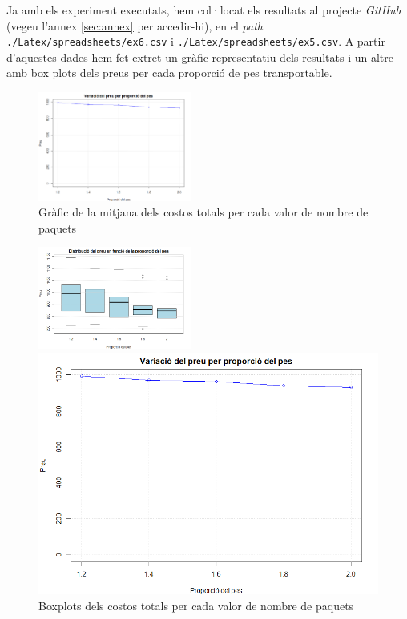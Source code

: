\documentclass[a4paper]{article}
\begin{document}
\begin{table}[ht]
	Ja amb els experiment executats, hem col·locat els resultats al projecte \textit{GitHub} (vegeu l'annex \ref{sec:annex} per accedir-hi), en el \textit{path} \texttt{./Latex/spreadsheets/ex6.csv} i \texttt{./Latex/spreadsheets/ex5.csv}. A partir d'aquestes dades hem fet extret un gràfic representatiu dels resultats i un altre amb box plots dels preus per cada proporció de pes transportable.
	
	\begin{figure}[H]
		\centering
		\includegraphics[width=0.45\textwidth]{exp5_grafic_lineal.png}
		\caption{Gràfic de la mitjana dels costos totals per cada valor de nombre de paquets}
		\label{fig:exp5_grafic_lineal}
	\end{figure}
	\begin{figure}[H]
		\centering
		\includegraphics[width=0.45\textwidth]{images/exp5_boxplot.png}
		\caption{Boxplots dels costos totals per cada valor de nombre de paquets}
		\label{fig:exp5_boxplot}
		\begin{minipage}{0.45\textwidth}
			\centering
			\includegraphics[width=\textwidth]{exp5_grafic_lineal.png}

\end{minipage}
\end{figure}
\end{table}
\end{document}

